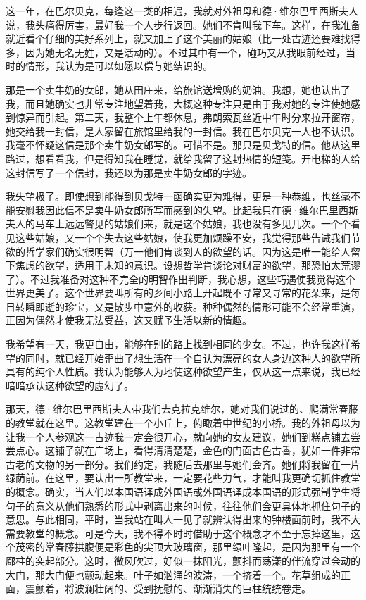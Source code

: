 \par 这一年，在巴尔贝克，每逢这一类的相遇，我就对外祖母和德·维尔巴里西斯夫人说，我头痛得厉害，最好我一个人步行返回。她们不肯叫我下车。这样，在我准备就近看个仔细的美好系列上，就又加上了这个美丽的姑娘（比一处古迹还要难找得多，因为她无名无姓，又是活动的）。不过其中有一个，碰巧又从我眼前经过，当时的情形，我认为是可以如愿以偿与她结识的。
\par 那是一个卖牛奶的女郎，她从田庄来，给旅馆送增购的奶油。我想，她也认出了我，而且她确实也非常专注地望着我，大概这种专注只是由于我对她的专注使她感到惊异而引起。第二天，我整个上午都休息，弗朗索瓦丝近中午时分来拉开窗帘，她交给我一封信，是人家留在旅馆里给我的一封信。我在巴尔贝克一人也不认识。我毫不怀疑这信是那个卖牛奶女郎写的。可惜不是。那只是贝戈特的信。他从这里路过，想看看我，但是得知我在睡觉，就给我留了这封热情的短笺。开电梯的人给这封信写了一个信封，我还以为那是卖牛奶女郎的字迹。
\par 我失望极了。即使想到能得到贝戈特一函确实更为难得，更是一种恭维，也丝毫不能安慰我因此信不是卖牛奶女郎所写而感到的失望。比起我只在德·维尔巴里西斯夫人的马车上远远瞥见的姑娘们来，就是这个姑娘，我也没有多见几次。一个个看见这些姑娘，又一个个失去这些姑娘，使我更加烦躁不安，我觉得那些告诫我们节欲的哲学家们确实很明智（万一他们肯谈到人的欲望的话。因为这是唯一能给人留下焦虑的欲望，适用于未知的意识。设想哲学肯谈论对财富的欲望，那恐怕太荒谬了）。不过我准备对这种不完全的明智作出判断，我心想，这些巧遇使我觉得这个世界更美了。这个世界要叫所有的乡间小路上开起既不寻常又寻常的花朵来，是每日转瞬即逝的珍宝，又是散步中意外的收获。种种偶然的情形可能不会经常重演，正因为偶然才使我无法受益，这又赋予生活以新的情趣。
\par 我希望有一天，我更自由，能够在别的路上找到相同的少女。不过，也许我这样希望的同时，就已经开始歪曲了想生活在一个自认为漂亮的女人身边这种人的欲望所具有的纯个人性质。我认为能够人为地使这种欲望产生，仅从这一点来说，我已经暗暗承认这种欲望的虚幻了。
\par 那天，德·维尔巴里西斯夫人带我们去克拉克维尔，她对我们说过的、爬满常春藤的教堂就在这里。这教堂建在一个小丘上，俯瞰着中世纪的小桥。我的外祖母以为让我一个人参观这一古迹我一定会很开心，就向她的女友建议，她们到糕点铺去尝尝点心。这铺子就在广场上，看得清清楚楚，金色的门面古色古香，犹如一件非常古老的文物的另一部分。我们约定，我随后去那里与她们会齐。她们将我留在一片绿荫前。在这里，要认出一所教堂来，一定要花些力气，才能叫我更确切抓住教堂的概念。确实，当人们以本国语译成外国语或外国语译成本国语的形式强制学生将句子的意义从他们熟悉的形式中剥离出来的时候，往往他们会更具体地抓住句子的意思。与此相同，平时，当我站在叫人一见了就辨认得出来的钟楼面前时，我不大需要教堂的概念。可是今天，我不得不时时借助于这个概念才不至于忘掉这里，这个茂密的常春藤拱腹便是彩色的尖顶大玻璃窗，那里绿叶隆起，是因为那里有一个廊柱的突起部分。这时，微风吹过，好似一抹阳光，颤抖而荡漾的伴流穿过会动的大门，那大门便也颤动起来。叶子如汹涌的波涛，一个挤着一个。花草组成的正面，震颤着，将波澜壮阔的、受到抚慰的、渐渐消失的巨柱统统卷走。
